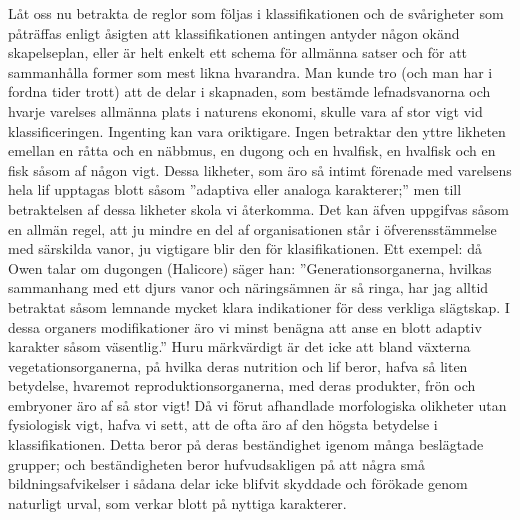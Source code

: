 Låt oss nu betrakta de reglor som följas i klassifikationen och de svårigheter som påträffas enligt åsigten att klassifikationen antingen antyder någon okänd skapelseplan, eller är helt enkelt ett schema för allmänna satser och för att sammanhålla former som mest likna hvarandra. Man kunde tro (och man har i fordna tider trott) att de delar i skapnaden, som bestämde lefnadsvanorna och hvarje varelses allmänna plats i naturens ekonomi, skulle vara af stor vigt vid klassificeringen. Ingenting kan vara oriktigare. Ingen betraktar den yttre likheten emellan en råtta och en näbbmus, en dugong och en hvalfisk, en hvalfisk och en fisk såsom af någon vigt. Dessa likheter, som äro så intimt förenade med varelsens hela lif upptagas blott såsom ”adaptiva eller analoga karakterer;” men till betraktelsen af dessa likheter skola vi återkomma. Det kan äfven uppgifvas såsom en allmän regel, att ju mindre en del af organisationen står i öfverensstämmelse med särskilda vanor, ju vigtigare blir den för klasifikationen. Ett exempel: då Owen talar om dugongen (Halicore) säger han: ”Generationsorganerna, hvilkas sammanhang med ett djurs vanor och näringsämnen är så ringa, har jag alltid betraktat såsom lemnande mycket klara indikationer för dess verkliga slägtskap. I dessa organers modifikationer äro vi minst benägna att anse en blott adaptiv karakter såsom väsentlig.” Huru märkvärdigt är det icke att bland växterna vegetationsorganerna, på hvilka deras nutrition och lif beror, hafva så liten betydelse, hvaremot reproduktionsorganerna, med deras produkter, frön och embryoner äro af så stor vigt! Då vi förut afhandlade morfologiska olikheter utan fysiologisk vigt, hafva vi sett, att de ofta äro af den högsta betydelse i klassifikationen. Detta beror på deras beständighet igenom många beslägtade grupper; och beständigheten beror hufvudsakligen på att några små bildningsafvikelser i sådana delar icke blifvit skyddade och förökade genom naturligt urval, som verkar blott på nyttiga karakterer.

